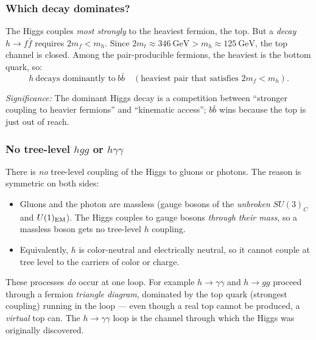 \subsubsection*{Which decay dominates?}

The Higgs couples \emph{most strongly} to the heaviest fermion, the top.
But a \emph{decay} $h\to f\bar f$ requires $2m_f<m_h$. Since
$2m_t\approx 346~\text{GeV} > m_h\approx 125~\text{GeV}$, the top channel
is closed. Among the pair-producible fermions, the heaviest is the
bottom quark, so:
\begin{equation}
  \boxed{
    h\ \text{decays dominantly to}\ b\bar b
    \quad(\text{heaviest pair that satisfies } 2m_f<m_h).
  }
  \label{eq:lec21:hbb}
\end{equation}

\textit{Significance:} The dominant Higgs decay is a competition between
``stronger coupling to heavier fermions'' and ``kinematic access'';
$b\bar b$ wins because the top is just out of reach.

\subsubsection*{No tree-level $hgg$ or $h\gamma\gamma$}

There is \emph{no} tree-level coupling of the Higgs to gluons or
photons. The reason is symmetric on both sides:
\begin{itemize}
  \item Gluons and the photon are massless (gauge bosons of the
        \emph{unbroken} $SU(3)_C$ and $U(1)_{\rm EM}$). The Higgs couples
        to gauge bosons \emph{through their mass}, so a massless boson
        gets no tree-level $h$ coupling.
  \item Equivalently, $h$ is color-neutral and electrically neutral, so
        it cannot couple at tree level to the carriers of color or
        charge.
\end{itemize}
These processes \emph{do} occur at one loop. For example
$h\to\gamma\gamma$ and $h\to gg$ proceed through a fermion
\emph{triangle diagram}, dominated by the top quark (strongest coupling)
running in the loop --- even though a real top cannot be produced, a
\emph{virtual} top can. The $h\to\gamma\gamma$ loop is the channel
through which the Higgs was originally discovered.

